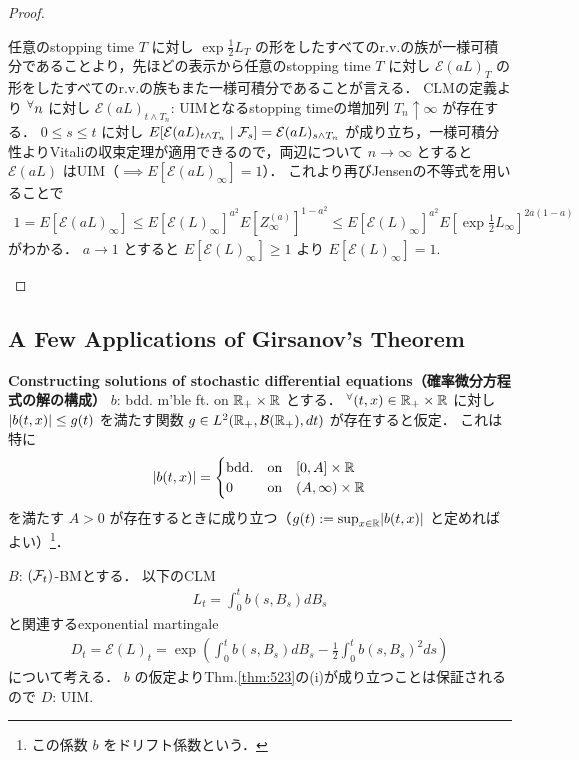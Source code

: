 \documentclass{jsarticle}
\begin{document}
\begin{proof}
\begin{description}
        任意のstopping time $T$ に対し $\exp\frac{1}{2}L_T$ の形をしたすべてのr.v.の族が一様可積分であることより，先ほどの表示から任意のstopping time $T$ に対し $\mathcal{E}(aL)_T$ の形をしたすべてのr.v.の族もまた一様可積分であることが言える．
        CLMの定義より ${}^{\forall} n$ に対し $\mathcal{E}(aL)_{t\wedge T_n}$: UIMとなるstopping timeの増加列 $T_n\uparrow\infty$ が存在する．
        $0\le s\le t$ に対し $E[\mathcal{E}(aL)_{t\wedge T_n}\mid\mathcal{F}_s]=\mathcal{E}(aL)_{s\wedge T_n}$ が成り立ち，一様可積分性よりVitaliの収束定理が適用できるので，両辺について $n\to\infty$ とすると $\mathcal{E}(aL)$ はUIM（$\implies E[\mathcal{E}(aL)_{\infty}]=1$）．
        これより再びJensenの不等式を用いることで
        \begin{align}
            1=E[\mathcal{E}(aL)_{\infty}]
            \le E[\mathcal{E}(L)_\infty]^{a^2}
            E[Z_{\infty}^{(a)}]^{1-a^2}
            \le E[\mathcal{E}(L)_\infty]^{a^2}
            E[\exp\frac{1}{2}L_\infty]^{2a(1-a)}
        \end{align}
        がわかる．
        $a\to1$ とすると $E[\mathcal{E}(L)_\infty]\ge1$ より $E[\mathcal{E}(L)_\infty]=1.$
    \end{description}
\end{proof}


\subsection{A Few Applications of Girsanov's Theorem}

\textbf{Constructing solutions of stochastic differential equations（確率微分方程式の解の構成）}
$b$: bdd. m'ble ft. on $\mathbb{R}_+\times\mathbb{R}$ とする．
${}^{\forall} (t,x)\in\mathbb{R}_+\times\mathbb{R}$ に対し $\lvert b(t,x)\rvert\le g(t)$ を満たす関数 $g\in L^2(\mathbb{R}_+,\mathcal{B}(\mathbb{R}_+),dt)$ が存在すると仮定．
これは特に
\begin{align}
    \lvert b(t,x)\rvert=
    \begin{cases}
        \text{bdd.} &\text{on}\quad [0,A]\times\mathbb{R} \\
        0 &\text{on}\quad (A,\infty)\times\mathbb{R}
    \end{cases}
\end{align}
を満たす $A>0$ が存在するときに成り立つ（$g(t):=\sup_{x\in\mathbb{R}}\lvert b(t,x)\rvert$ と定めればよい）\footnote{この係数 $b$ をドリフト係数という．}．

$B$: $(\mathcal{F}_t)$-BMとする．
以下のCLM
\begin{align}
    L_t=\int_0^t b(s,B_s)dB_s
\end{align}
と関連するexponential martingale
\begin{align}
    D_t
    = \mathcal{E}(L)_t
    = \exp\left(\int_0^t b(s,B_s)dB_s-\frac{1}{2}\int_0^t b(s,B_s)^2 ds\right)
\end{align}
について考える．
$b$ の仮定よりThm.\ref{thm:523}の(i)が成り立つことは保証されるので $D$: UIM.
\end{document}
